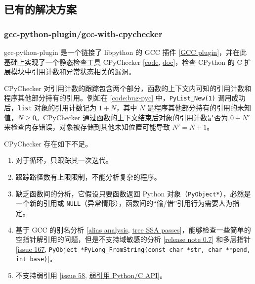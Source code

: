 \subsection{已有的解决方案}
\label{sec:membug-solutions}

\subsubsection{gcc-python-plugin/gcc-with-cpychecker}

gcc-python-plugin 是一个链接了 libpython 的 GCC 插件 [\href{https://gcc.gnu.org/onlinedocs/gccint/Plugins.html}{GCC plugin}]，并在此基础上实现了一个静态检查工具 CPyChecker [\href{https://github.com/davidmalcolm/gcc-python-plugin/blob/master/gcc-with-cpychecker}{code}, \href{https://gcc-python-plugin.readthedocs.io/en/latest/cpychecker.html}{doc}]，检查 CPython 的 C 扩展模块中引用计数和异常状态相关的漏洞。

CPyChecker 对引用计数的跟踪包含两个部分，函数的上下文内可知的引用计数和程序其他部分持有的引用。例如在 \autoref{code:bug-pyc} 中，\texttt{PyList\_New(1)} 调用成功后，\texttt{list} 对象的引用计数记为 $1+N$，其中 $N$ 是程序其他部分持有的引用的未知值，$N \ge 0$。CPyChecker 通过函数的上下文结束后对象的引用计数是否为 $0 + N'$ 来检查内存错误，对象被存储到其他未知位置可能导致 $N' = N + 1$。

CPyChecker 存在如下不足。

\begin{enumerate}
\item 对于循环，只跟踪其一次迭代。
\item 跟踪路径数有上限限制，不能分析复杂的程序。
\item 缺乏函数间的分析，它假设只要函数返回 Python 对象（\texttt{PyObject*}），必然是一个新的引用或 \texttt{NULL}（异常情形），函数间的“偷/借”引用行为需要人为指定。
\item 基于 GCC 的别名分析 [\href{https://gcc.gnu.org/onlinedocs/gccint/Alias-analysis.html}{alias analysis}, \href{https://gcc.gnu.org/onlinedocs/gccint/Tree-SSA-passes.html}{tree SSA passes}]，能够检查一些简单的空指针解引用的问题，但是不支持域敏感的分析 [\href{https://gcc-python-plugin.readthedocs.io/en/latest/0.7.html#signal-noise-ratio-improvements}{release note 0.7}] 和多层指针 [\href{https://github.com/davidmalcolm/gcc-python-plugin/issues/167}{issue 167}, \texttt{PyObject *PyLong\_FromString(const char *str, char **pend, int base)}]。
\item 不支持弱引用 [\href{https://github.com/davidmalcolm/gcc-python-plugin/issues/58}{issue 58}, \href{https://docs.python.org/3/c-api/weakref.html}{弱引用 Python/C API}]。
\end{enumerate}

